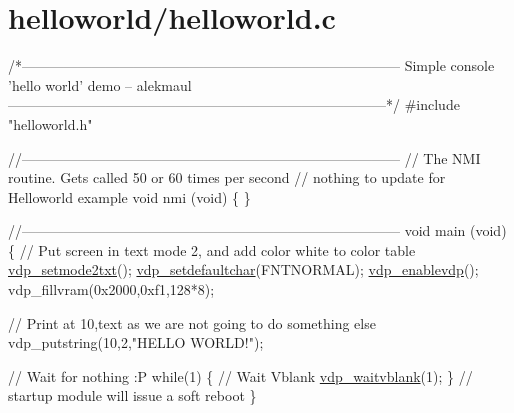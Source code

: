 \hypertarget{a00063}{}\section{helloworld/helloworld.\+c}

\begin{DoxyCodeInclude}
\textcolor{comment}{/*---------------------------------------------------------------------------------}
\textcolor{comment}{}
\textcolor{comment}{}
\textcolor{comment}{    Simple console 'hello world' demo}
\textcolor{comment}{    -- alekmaul}
\textcolor{comment}{}
\textcolor{comment}{}
\textcolor{comment}{---------------------------------------------------------------------------------*/}
\textcolor{preprocessor}{#include "helloworld.h"}

\textcolor{comment}{//---------------------------------------------------------------------------------}
\textcolor{comment}{// The NMI routine. Gets called 50 or 60 times per second }
\textcolor{comment}{// nothing to update for Helloworld example}
\textcolor{keywordtype}{void} nmi (\textcolor{keywordtype}{void}) \{
\}

\textcolor{comment}{//---------------------------------------------------------------------------------}
\textcolor{keywordtype}{void} main (\textcolor{keywordtype}{void}) \{
    \textcolor{comment}{// Put screen in text mode 2, and add color white to color table}
    \hyperlink{a00056_a82f80697be61ae9fc4651379b907190a}{vdp\_setmode2txt}();
    \hyperlink{a00056_a56edf716a6be2b5850249d24861fc845}{vdp\_setdefaultchar}(FNTNORMAL);
    \hyperlink{a00056_a79f55e5785e18e189852d14a78f7da64}{vdp\_enablevdp}();
    vdp\_fillvram(0x2000,0xf1,128*8);
    
    \textcolor{comment}{// Print at 10,text as we are not going to do something else}
    vdp\_putstring(10,2,\textcolor{stringliteral}{"HELLO WORLD!"});
    
    \textcolor{comment}{// Wait for nothing :P}
    \textcolor{keywordflow}{while}(1) \{
        \textcolor{comment}{// Wait Vblank}
        \hyperlink{a00056_a83dfd82e385330c883c67c30137f9857}{vdp\_waitvblank}(1);
    \}
    \textcolor{comment}{// startup module will issue a soft reboot }
\}
\end{DoxyCodeInclude}
 